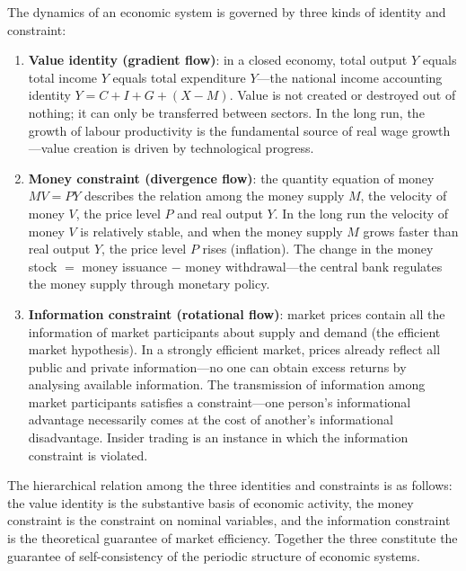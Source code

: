 \begin{theorem}\label{thm:economic_conservation}
The dynamics of an economic system is governed by three kinds of identity and constraint:
\begin{enumerate}[label=(\roman*)]
    \item \textbf{Value identity (gradient flow)}: in a closed economy, total output $Y$ equals total income $Y$ equals total expenditure $Y$---the national income accounting identity $Y = C + I + G + (X - M)$. Value is not created or destroyed out of nothing; it can only be transferred between sectors. In the long run, the growth of labour productivity is the fundamental source of real wage growth---value creation is driven by technological progress.
    \item \textbf{Money constraint (divergence flow)}: the quantity equation of money $MV = PY$ describes the relation among the money supply $M$, the velocity of money $V$, the price level $P$ and real output $Y$. In the long run the velocity of money $V$ is relatively stable, and when the money supply $M$ grows faster than real output $Y$, the price level $P$ rises (inflation). The change in the money stock $=$ money issuance $-$ money withdrawal---the central bank regulates the money supply through monetary policy.
    \item \textbf{Information constraint (rotational flow)}: market prices contain all the information of market participants about supply and demand (the efficient market hypothesis). In a strongly efficient market, prices already reflect all public and private information---no one can obtain excess returns by analysing available information. The transmission of information among market participants satisfies a constraint---one person's informational advantage necessarily comes at the cost of another's informational disadvantage. Insider trading is an instance in which the information constraint is violated.
\end{enumerate}
The hierarchical relation among the three identities and constraints is as follows: the value identity is the substantive basis of economic activity, the money constraint is the constraint on nominal variables, and the information constraint is the theoretical guarantee of market efficiency. Together the three constitute the guarantee of self-consistency of the periodic structure of economic systems.
\end{theorem}

